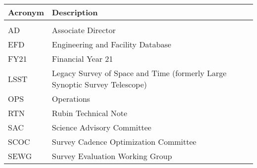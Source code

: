 \addtocounter{table}{-1}
\begin{longtable}{p{}p{}}\hline
\textbf{Acronym} & \textbf{Description}  \\\hline

 &  \\\hline
AD & Associate Director \\\hline
EFD & Engineering and Facility Database \\\hline
FY21 & Financial Year 21 \\\hline
LSST & Legacy Survey of Space and Time (formerly Large Synoptic Survey Telescope) \\\hline
OPS & Operations \\\hline
RTN & Rubin Technical Note \\\hline
SAC & Science Advisory Committee \\\hline
SCOC & Survey Cadence Optimization Committee \\\hline
SEWG & Survey Evaluation Working Group \\\hline
\end{longtable}
